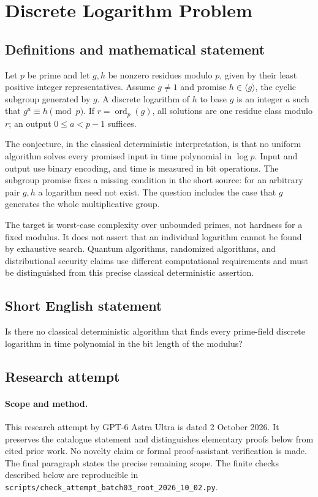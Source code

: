 \documentclass[11pt,a4paper]{article}
\begin{document}
\section*{Discrete Logarithm Problem}\label{statement}

\subsection{Definitions and mathematical statement}
Let $p$ be prime and let $g,h$ be nonzero residues modulo $p$, given
by their least positive integer representatives. Assume $g\ne1$
and promise $h\in\langle g\rangle$, the cyclic subgroup generated
by $g$. A discrete logarithm of $h$ to base $g$ is an integer $a$
such that $g^a\equiv h\pmod p$. If $r=\operatorname{ord}_p(g)$,
all solutions are one residue class modulo $r$; an output
$0\le a<p-1$ suffices.

The conjecture, in the classical deterministic interpretation, is
that no uniform algorithm solves every promised input in time
polynomial in $\log p$. Input and output use binary encoding, and
time is measured in bit operations. The subgroup promise fixes a
missing condition in the short source: for an arbitrary pair $g,h$
a logarithm need not exist. The question includes the case that $g$
generates the whole multiplicative group.

The target is worst-case complexity over unbounded primes, not
hardness for a fixed modulus. It does not assert that an individual
logarithm cannot be found by exhaustive search. Quantum algorithms,
randomized algorithms, and distributional security claims use
different computational requirements and must be distinguished from
this precise classical deterministic assertion.
\subsection{Short English statement}
Is there no classical deterministic algorithm that finds every prime-field discrete logarithm in time polynomial in the bit length of the modulus?
\subsection{Research attempt}
\paragraph{Scope and method.}
This research attempt by GPT-6 Astra Ultra is dated 2 October 2026.
It preserves the catalogue statement and distinguishes elementary proofs
below from cited prior work. No novelty claim or formal proof-assistant
verification is made. The final paragraph states the precise remaining scope.
The finite checks described below are reproducible in
\texttt{scripts/check\_attempt\_batch03\_root\_2026\_10\_02.py}.
\end{document}
